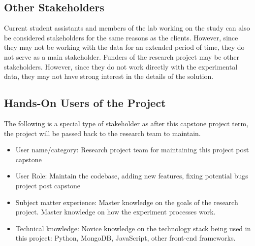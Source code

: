 \documentclass[12pt]{article}
\begin{document}
\subsection{Other Stakeholders}
Current student assistants and members of the lab working on the study can also be
considered stakeholders for the same reasons as the clients. However, since they
may not be working with the data for an extended period of time, they do not
serve as a main stakeholder. Funders of the research project may be other
stakeholders. However, since they do not work directly with the experimental
data, they may not have strong interest in the details of the solution.
\subsection{Hands-On Users of the Project}
\label{sec:2.4}
The following is a special type of stakeholder as after this capstone project
term, the project will be passed back to the research team to maintain. 
\begin{itemize}
  \item User name/category: Research project team for maintaining this project post capstone 
  \item User Role: Maintain the codebase, adding new features, fixing potential bugs
  project post capstone
  \item Subject matter experience: Master knowledge on the goals of the research
  project. Master knowledge on how the experiment processes work. 
  \item Technical knowledge: Novice knowledge on the technology stack being
  used in this project: Python, MongoDB, JavaScript, other front-end frameworks.
\end{itemize}
\end{document}
